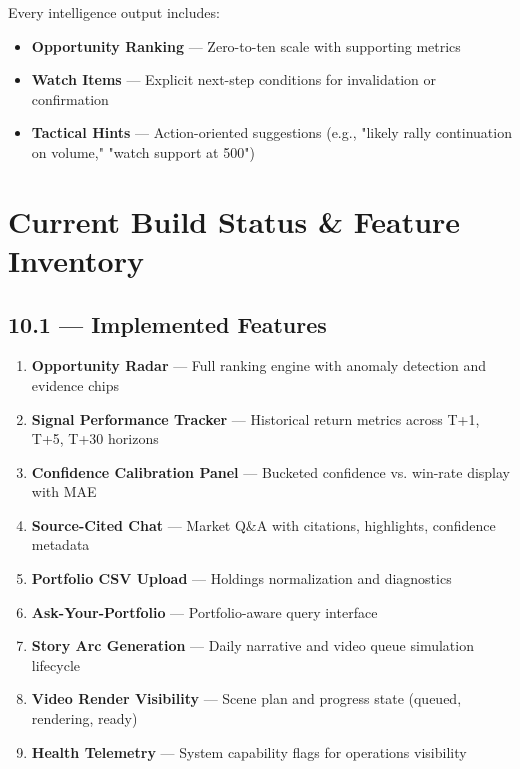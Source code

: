 \documentclass[11pt,a4paper]{article}
\begin{document}
Every intelligence output includes:

\begin{itemize}
    \item \textbf{Opportunity Ranking} — Zero-to-ten scale with supporting metrics
    \item \textbf{Watch Items} — Explicit next-step conditions for invalidation or confirmation
    \item \textbf{Tactical Hints} — Action-oriented suggestions (e.g., "likely rally continuation on volume," "watch support at 500")
\end{itemize}

\section{Current Build Status \& Feature Inventory}

\subsection{10.1 — Implemented Features}

\begin{tcolorbox}[colback=mn-success!15, colframe=mn-success, arc=1mm, boxsep=10pt]
\small

\begin{enumerate}[label={\textcolor{mn-success}{\facheck}}, leftmargin=1.5cm, itemsep=0.3cm]
    \item \textbf{Opportunity Radar} — Full ranking engine with anomaly detection and evidence chips
    \item \textbf{Signal Performance Tracker} — Historical return metrics across T+1, T+5, T+30 horizons
    \item \textbf{Confidence Calibration Panel} — Bucketed confidence vs. win-rate display with MAE
    \item \textbf{Source-Cited Chat} — Market Q\&A with citations, highlights, confidence metadata
    \item \textbf{Portfolio CSV Upload} — Holdings normalization and diagnostics
    \item \textbf{Ask-Your-Portfolio} — Portfolio-aware query interface
    \item \textbf{Story Arc Generation} — Daily narrative and video queue simulation lifecycle
    \item \textbf{Video Render Visibility} — Scene plan and progress state (queued, rendering, ready)
    \item \textbf{Health Telemetry} — System capability flags for operations visibility
\end{enumerate}

\end{tcolorbox}
\end{document}
